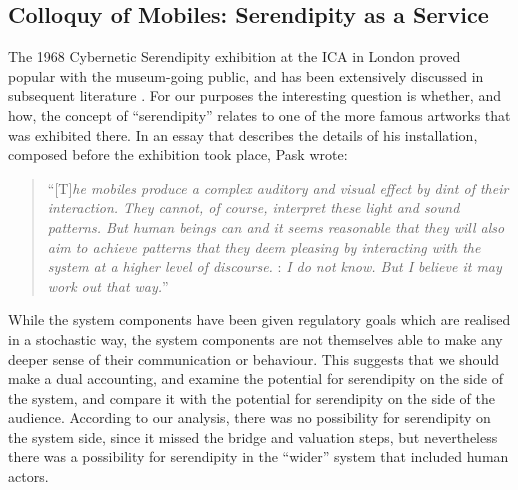 \subsection{{\sf Colloquy of Mobiles}: Serendipity as a Service}

The 1968 Cybernetic Serendipity exhibition at the ICA in London proved popular with the museum-going public, and has been extensively discussed in subsequent literature
\cite{Edmonds1994,macgregor2002cybernetic,usselmann2003dilemma}.  For
our purposes the interesting question is whether, and how, the concept
of ``serendipity'' relates to one of the more famous artworks that was
exhibited there.
In an essay that describes the details of his installation, composed
before the exhibition took place, Pask wrote:

\begin{quote}
``[T]\emph{he mobiles produce a complex auditory and visual effect by
  dint of their interaction.  They cannot, of course, interpret these
  light and sound patterns.  But human beings can and it seems
  reasonable that they will also aim to achieve patterns that they deem
  pleasing by interacting with the system at a higher level of
  discourse.}
: 
\emph{I do not know.  But I believe it may work out that way.}''  \cite[p.~91]{pask1971comment}
\end{quote}

While the system components have been given regulatory goals which are
realised in a
stochastic way, the
system components are not themselves able to make any deeper sense of
their communication or behaviour.  This suggests that we should make a
dual accounting, and examine the potential for serendipity on the
side of the system, and compare it with the potential for serendipity
on the side of the audience.
According to our analysis, there was no possibility for serendipity on
the system side, since it missed the bridge and valuation steps, but nevertheless there was a possibility for
serendipity in the ``wider'' system that included human actors.



